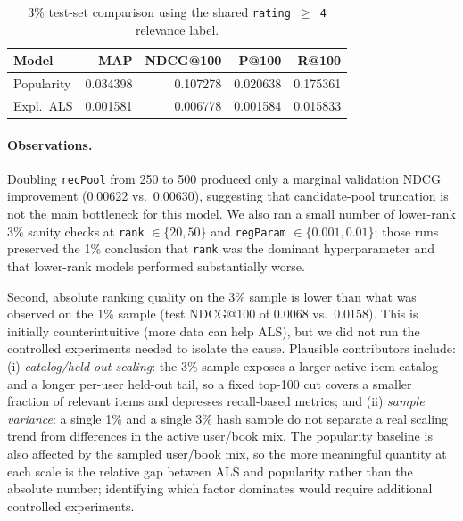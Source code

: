 \documentclass[10pt,twocolumn]{article}
\begin{document}
\begin{table}[!ht]
\centering
\caption{3\% test-set comparison using the shared \texttt{rating $\geq$ 4} relevance label.}
\label{tab:compare3pct}
\footnotesize
\setlength{\tabcolsep}{3pt}
\begin{tabular}{l r r r r}
\toprule
\textbf{Model} & \textbf{MAP} & \textbf{NDCG@100} & \textbf{P@100} & \textbf{R@100} \\
\midrule
Popularity & 0.034398 & 0.107278 & 0.020638 & 0.175361 \\
Expl.~ALS  & 0.001581 & 0.006778 & 0.001584 & 0.015833 \\
\bottomrule
\end{tabular}
\end{table}

\paragraph{Observations.} Doubling \texttt{recPool} from 250 to 500 produced only a marginal validation NDCG improvement (0.00622 vs.\ 0.00630), suggesting that candidate-pool truncation is not the main bottleneck for this model. We also ran a small number of lower-rank 3\% sanity checks at \texttt{rank} $\in \{20,50\}$ and \texttt{regParam} $\in \{0.001,0.01\}$; those runs preserved the 1\% conclusion that \texttt{rank} was the dominant hyperparameter and that lower-rank models performed substantially worse.

Second, absolute ranking quality on the 3\% sample is lower than what was observed on the 1\% sample (test NDCG@100 of 0.0068 vs.\ 0.0158). This is initially counterintuitive (more data can help ALS), but we did not run the controlled experiments needed to isolate the cause. Plausible contributors include: (i) \emph{catalog/held-out scaling}: the 3\% sample exposes a larger active item catalog and a longer per-user held-out tail, so a fixed top-100 cut covers a smaller fraction of relevant items and depresses recall-based metrics; and (ii) \emph{sample variance}: a single 1\% and a single 3\% hash sample do not separate a real scaling trend from differences in the active user/book mix. The popularity baseline is also affected by the sampled user/book mix, so the more meaningful quantity at each scale is the relative gap between ALS and popularity rather than the absolute number; identifying which factor dominates would require additional controlled experiments.
\end{document}
